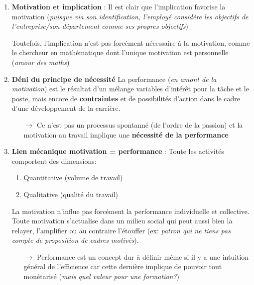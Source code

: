 \documentclass[11pt]{article} %
\begin{document}
\begin{enumerate}
    \item \textbf{Motivation et implication} :
        Il est clair que l'implication favorise la motivation
        (\textit{puisque via son identification, l'employé considère les
        objectifs de l'entreprise/son département comme ses propres
        objectifs})

        Toutefois, l'implication n'est pas forcément nécessaire à la
        motivation, comme le chercheur en mathématique dont l'unique
        motivation est personnelle (\textit{amour des maths})

    \item \textbf{Déni du principe de nécessité}
        La performance (\textit{en amont de la motivation}) est
        le résultat d'un mélange variables d'intérêt pour la
        tâche et le poste, mais encore de \textbf{contraintes} et de
        possibilités d'action dans le cadre d'une développement de la
        carrière.

        \begin{itemize}
            \item[$\to$] Ce n'est pas un processus spontanné (de l'ordre
                de la passion) et la motivation au travail implique une
                \textbf{nécessité de la performance}
        \end{itemize}

    \item \textbf{Lien mécanique motivation = performance} :
		Toute les activités comportent des dimensions:
		\begin{enumerate}
			\item Quantitative (volume de travail)
			\item Qualitative (qualité du travail)
		\end{enumerate}

        La motivation n'influe pas forcément la performance individuelle et
        collective. Toute motivation s'actualise dans un milieu social qui
        peut aussi bien la relayer, l'amplifier ou au contraire l'étouffer
        (ex: \textit{patron qui ne tiens pas compte de proposition de cadres
        motivés}).

        \begin{itemize}
            \item[$\to$] Performance est un concept dur à définir
                même si il y a une intuition général de l'efficience car
                cette dernière implique de pouvoir tout monétarisé
                (\textit{mais quel valeur pour une formation?})
        \end{itemize}
                
\end{enumerate}
\end{document}
